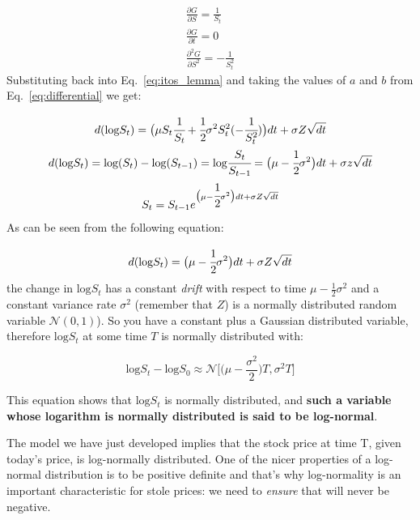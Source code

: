 \begin{equation}
\begin{gathered}
\frac{\partial G}{\partial S} = \frac{1}{S_t}\\
\frac{\partial G}{\partial t} = 0\\
\frac{\partial^2 G}{\partial S^2} = -\frac{1}{S_t^{2}}
\end{gathered}
\end{equation}
Substituting back into Eq.~\ref{eq:itos_lemma} and taking the values of $a$ and $b$ from Eq.~\ref{eq:differential} we get:

\begin{equation}
\begin{gathered}
d(\textrm{log} S_t) = \big(\mu S_t \cfrac{1}{S_t} + \cfrac{1}{2}\sigma^2 S_t^2 (-\cfrac{1}{S_t^2})\big)dt + \sigma Z\sqrt{dt}\\
d(\textrm{log} S_t) = \textrm{log} (S_t) - \textrm{log} (S_{t-1}) = \textrm{log} \cfrac{S_t}{S_{t-1}} = \big(\mu - \cfrac{1}{2}\sigma^2\big)dt + \sigma z\sqrt{dt}\\
S_t = S_{t-1}e^{\big(\mu - \cfrac{1}{2}\sigma^2\big)dt + \sigma Z\sqrt{dt}}
\end{gathered}
\label{eq:gbm_solution}
\end{equation}
As can be seen from the following equation:

\begin{equation}
d(\textrm{log} S_t) = \big(\mu - \cfrac{1}{2}\sigma^2\big)dt + \sigma Z\sqrt{dt}
\end{equation}
the change in \(\textrm{log} S_t\) has a constant \emph{drift} with respect to time \(\mu - \frac{1}{2}\sigma^2\) and a constant variance rate \(\sigma^2\) (remember that $Z$) is a normally distributed random variable \(\mathcal{N}(0,1)\)). So you have a constant plus a Gaussian
distributed variable, therefore \(\textrm{log} S_t\) at some time \(T\) is normally distributed with:

\begin{equation}
\textrm{log}S_t - \textrm{log}S_0 \approx\mathcal{N}\big[\big(\mu-\frac{\sigma^2}{2}\big)T, \sigma^2 T\big]
\end{equation}

This equation shows that \(\textrm{log}S_t\) is normally distributed, and \textbf{such a variable whose logarithm is normally distributed is said to be log-normal}. 

The model we have just developed implies that the stock price at time T, given today's price, is log-normally distributed. One of the nicer properties of a log-normal distribution is to be positive definite and that's why log-normality is an important characteristic for stole prices: we need to \emph{ensure} that will never be negative. 

